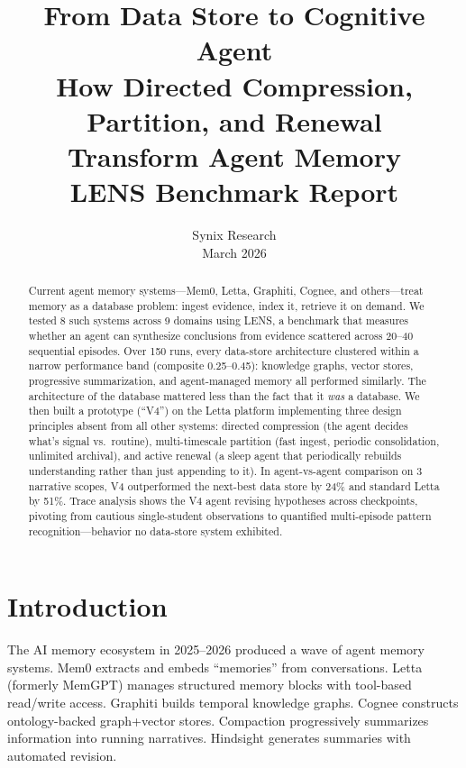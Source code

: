 \documentclass[11pt,letterpaper]{article}
\title{\textbf{From Data Store to Cognitive Agent}\\[0.4em]
\Large How Directed Compression, Partition, and Renewal\\Transform Agent Memory\\[0.6em]
\large LENS Benchmark Report}
\author{Synix Research \\ March 2026}
\date{}
\begin{document}
\maketitle
\thispagestyle{empty}

\begin{abstract}
\noindent
Current agent memory systems---Mem0, Letta, Graphiti, Cognee, and others---treat memory as a database problem: ingest evidence, index it, retrieve it on demand. We tested 8 such systems across 9 domains using LENS, a benchmark that measures whether an agent can synthesize conclusions from evidence scattered across 20--40 sequential episodes. Over 150 runs, every data-store architecture clustered within a narrow performance band (composite 0.25--0.45): knowledge graphs, vector stores, progressive summarization, and agent-managed memory all performed similarly. The architecture of the database mattered less than the fact that it \emph{was} a database. We then built a prototype (``V4'') on the Letta platform implementing three design principles absent from all other systems: directed compression (the agent decides what's signal vs.\ routine), multi-timescale partition (fast ingest, periodic consolidation, unlimited archival), and active renewal (a sleep agent that periodically rebuilds understanding rather than just appending to it). In agent-vs-agent comparison on 3 narrative scopes, V4 outperformed the next-best data store by 24\% and standard Letta by 51\%. Trace analysis shows the V4 agent revising hypotheses across checkpoints, pivoting from cautious single-student observations to quantified multi-episode pattern recognition---behavior no data-store system exhibited.
\end{abstract}

\tableofcontents
\newpage

\section{Introduction}

The AI memory ecosystem in 2025--2026 produced a wave of agent memory systems. Mem0 extracts and embeds ``memories'' from conversations. Letta (formerly MemGPT) manages structured memory blocks with tool-based read/write access. Graphiti builds temporal knowledge graphs. Cognee constructs ontology-backed graph+vector stores. Compaction progressively summarizes information into running narratives. Hindsight generates summaries with automated revision.
\end{document}
